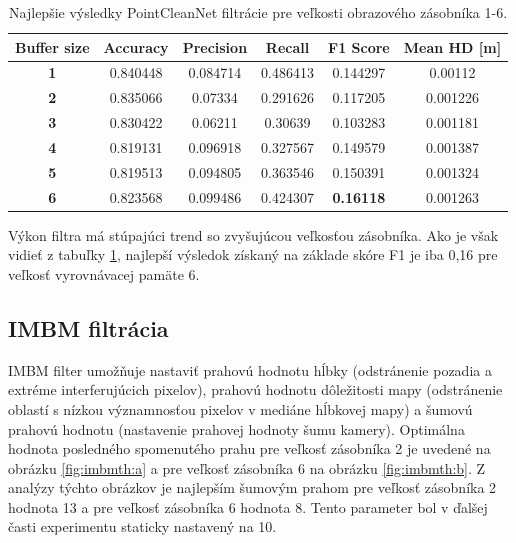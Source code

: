 \begin{table}[h]
	\caption{\label{tab:pcn_best} Najlepšie výsledky PointCleanNet filtrácie pre veľkosti obrazového zásobníka 1-6.}
	\centering
	\begin{tabular}{cccccc}
		\toprule
		\textbf{Buffer size} & \textbf{Accuracy} & \textbf{Precision} & \textbf{Recall} & \textbf{F1 Score} & \textbf{Mean HD [m]} \\ 
		\midrule
		\textbf{1}           & 0.840448          & 0.084714           & 0.486413        & 0.144297          & 0.00112                         \\ 
		\textbf{2}           & 0.835066          & 0.07334            & 0.291626        & 0.117205          & 0.001226                        \\ 
		\textbf{3}           & 0.830422          & 0.06211            & 0.30639         & 0.103283          & 0.001181                        \\ 
		\textbf{4}           & 0.819131          & 0.096918           & 0.327567        & 0.149579          & 0.001387                        \\ 
		\textbf{5}           & 0.819513          & 0.094805           & 0.363546        & 0.150391          & 0.001324                        \\ 
		\textbf{6}           & 0.823568          & 0.099486           & 0.424307        & \textbf{0.16118}           & 0.001263                        \\ 
		\bottomrule
	\end{tabular}
\end{table}

Výkon filtra má stúpajúci trend so zvyšujúcou veľkosťou zásobníka. Ako je však vidieť z tabuľky \ref{tab:pcn_best}, najlepší výsledok získaný na základe skóre F1 je iba 0,16 pre veľkosť vyrovnávacej pamäte 6.

\subsection{IMBM filtrácia}
\label{sec:imbm:filtration}

IMBM filter umožňuje nastaviť prahovú hodnotu hĺbky (odstránenie pozadia a extréme interferujúcich pixelov), prahovú hodnotu dôležitosti mapy (odstránenie oblastí s nízkou významnosťou pixelov v mediáne hĺbkovej mapy) a šumovú prahovú hodnotu (nastavenie prahovej hodnoty šumu kamery). Optimálna hodnota posledného spomenutého prahu pre veľkosť zásobníka 2 je uvedené na obrázku \ref{fig:imbmth:a} a pre veľkosť zásobníka 6 na obrázku \ref {fig:imbmth:b}. Z analýzy týchto obrázkov je najlepším šumovým prahom pre veľkosť zásobníka 2 hodnota 13 a pre veľkosť zásobníka 6 hodnota 8. Tento parameter bol v ďalšej časti experimentu staticky nastavený na 10.


